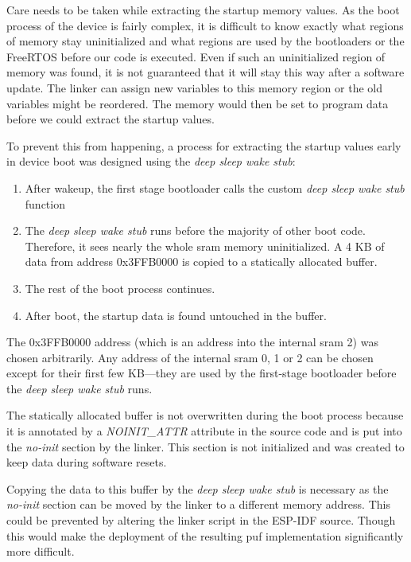 Care needs to be taken while extracting the startup memory values. As the boot process of the device is fairly complex, it is difficult to know exactly what regions of memory stay uninitialized and what regions are used by the bootloaders or the FreeRTOS before our code is executed. Even if such an uninitialized region of memory was found, it is not guaranteed that it will stay this way after a software update. The linker can assign new variables to this memory region or the old variables might be reordered. The memory would then be set to program data before we could extract the startup values.

To prevent this from happening, a process for extracting the startup values early in device boot was designed using the \emph{deep sleep wake stub}:

\begin{enumerate}
    \item After wakeup, the first stage bootloader calls the custom \emph{deep sleep wake stub} function
    \item The \emph{deep sleep wake stub} runs before the majority of other boot code. Therefore, it sees nearly the whole \gls{sram} memory uninitialized. A 4 KB of data from address 0x3FFB0000 is copied to a statically allocated buffer.
    \item The rest of the boot process continues.
    \item After boot, the startup data is found untouched in the buffer.
\end{enumerate}

The 0x3FFB0000 address (which is an address into the internal \gls{sram} 2) was chosen arbitrarily. Any address of the internal \gls{sram} 0, 1 or 2 can be chosen except for their first few KB---they are used by the first-stage bootloader before the \emph{deep sleep wake stub} runs.

The statically allocated buffer is not overwritten during the boot process because it is annotated by a \emph{NOINIT\_ATTR} attribute in the source code and is put into the \emph{no-init} section by the linker. This section is not initialized and was created to keep data during software resets.~\cite{espidf2022}

Copying the data to this buffer by the \emph{deep sleep wake stub} is necessary as the \emph{no-init} section can be moved by the linker to a different memory address. This could be prevented by altering the linker script in the ESP-IDF source. Though this would make the deployment of the resulting \gls{puf} implementation significantly more difficult.


